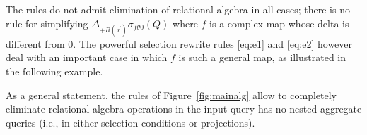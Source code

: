 The rules do not admit elimination of relational algebra in all cases;
there is no rule for simplifying
$\Delta_{+R(\vec{r})} \sigma_{f \theta 0}(Q)$ where $f$ is a complex map whose
delta is different from 0. The powerful selection rewrite rules \ref{eq:e1} and \ref{eq:e2} however deal with an important case in which $f$ is such a general map, as illustrated in the following example.

As a general statement, the rules of Figure~\ref{fig:mainalg} allow to
completely eliminate relational algebra operations in the input query has
no nested aggregate queries (i.e., in either selection conditions or
projections).


\pagebreak

{ }~{ }

\pagebreak

{ }~{ }

\pagebreak

